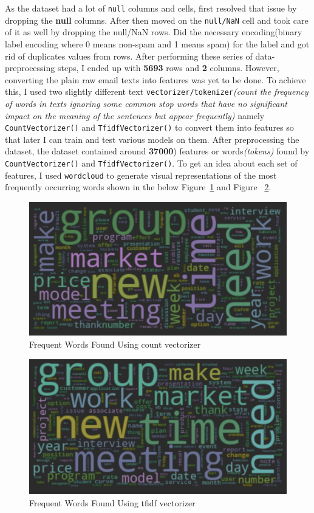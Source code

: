 As the dataset had a lot of \verb|null| columns and cells, first resolved that issue by dropping the \textbf{null} columns.
After then moved on the \verb|null/NaN| cell and took care of it as well by dropping the null/NaN rows.
Did the necessary encoding(binary label encoding where 0 means non-spam and 1 means spam) for the label and got rid of duplicates values from rows.
After performing these series of data-preprocessing steps, I ended up with \textbf{5693} rows and \textbf{2} columns.
However, converting the plain raw email texts into features was yet to be done.
To achieve this, I used two slightly different text \verb|vectorizer/tokenizer|\textit{(count the frequency of words in texts ignoring some common stop words that have no significant impact on the meaning of the sentences but appear frequently)}\cite{countvectorizer_in_nlp_2020}
namely \verb|CountVectorizer()| and \verb|TfidfVectorizer()| to convert them into features so that later I can train and test various models on them.
After preprocessing the dataset, the dataset contained around \textbf{37000}) features or words\textit{(tokens)} found by \verb|CountVectorizer()| and \verb|TfidfVectorizer()|.
To get an idea about each set of features, I used \verb|wordcloud| to generate visual representations of the most frequently occurring words shown in the below Figure~\ref{fig:cout_vect} and Figure ~\ref{fig:tfidf_vect}.

\begin{figure}[H]
    \begin{center}
        \includegraphics[scale=0.4]{Graphics/images/count_vect}
    \end{center}
    \caption{Frequent Words Found Using count vectorizer}
    \label{fig:cout_vect}
\end{figure}

\begin{figure}[H]
    \begin{center}
        \includegraphics[scale=0.4]{Graphics/images/tfid_vect}
    \end{center}
    \caption{Frequent Words Found Using tfidf vectorizer}
    \label{fig:tfidf_vect}
\end{figure}